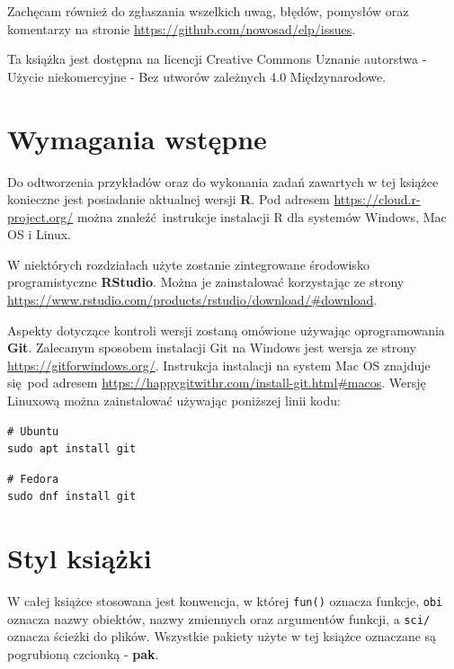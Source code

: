 \documentclass[paper=6in:9in,pagesize=pdftex,headinclude=on,footinclude=on,10pt]{scrbook}
\begin{document}
Zachęcam również do zgłaszania wszelkich uwag, błędów, pomysłów oraz komentarzy na stronie \url{https://github.com/nowosad/elp/issues}.

Ta książka jest dostępna na licencji Creative Commons Uznanie autorstwa - Użycie niekomercyjne - Bez utworów zależnych 4.0 Międzynarodowe.

\hypertarget{wymagania-wstux119pne}{%
\section*{Wymagania wstępne}\label{wymagania-wstux119pne}}

Do odtworzenia przykładów oraz do wykonania zadań zawartych w tej książce konieczne jest posiadanie aktualnej wersji \textbf{R}.
Pod adresem \url{https://cloud.r-project.org/} można znaleźć~instrukcje instalacji R dla systemów Windows, Mac OS i Linux.

W niektórych rozdziałach użyte zostanie zintegrowane środowisko programistyczne \textbf{RStudio}.
Można je zainstalować korzystając ze strony \url{https://www.rstudio.com/products/rstudio/download/\#download}.

Aspekty dotyczące kontroli wersji zostaną omówione używając oprogramowania \textbf{Git}.
Zalecanym sposobem instalacji Git na Windows jest wersja ze strony \url{https://gitforwindows.org/}.
Instrukcja instalacji na system Mac OS znajduje się~pod adresem \url{https://happygitwithr.com/install-git.html\#macos}.
Wersję Linuxową można zainstalować używając poniższej linii kodu:

\begin{verbatim}
# Ubuntu
sudo apt install git
\end{verbatim}

\begin{verbatim}
# Fedora
sudo dnf install git
\end{verbatim}

\hypertarget{styl-ksiux105ux17cki}{%
\section*{Styl książki}\label{styl-ksiux105ux17cki}}

W całej książce stosowana jest konwencja, w której \texttt{fun()} oznacza funkcje, \texttt{obi} oznacza nazwy obiektów, nazwy zmiennych oraz argumentów funkcji, a \texttt{sci/} oznacza ścieżki do plików.
Wszystkie pakiety użyte w tej książce oznaczane są pogrubioną czcionką - \textbf{pak}.
\end{document}
